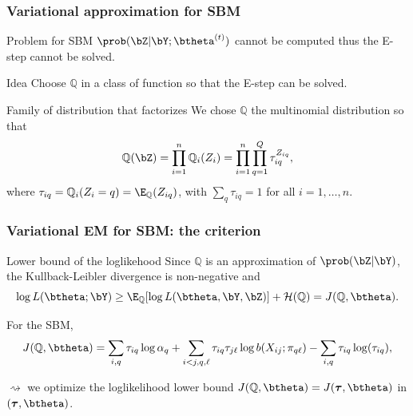 \documentclass{beamer}\usepackage[]{graphicx}\usepackage[]{color}
\begin{document}
\begin{frame}
  \frametitle{Variational approximation for SBM}

    \begin{block}{Problem for SBM}
      $\prob(\bZ|\bY;\btheta^{(t)})$ cannot be computed thus the E-step cannot be solved.
  \end{block}

  \begin{block}{Idea}
      Choose $\mathbb{Q}$ in a class of function so that the E-step can be solved.
  \end{block}

  \begin{block}{Family of distribution that factorizes}
      We chose $\mathbb{Q}$ the multinomial distribution so that
      \begin{equation*}
        \mathbb{Q}(\bZ) = \prod_{i=1}^n \mathbb{Q}_i(Z_i) = \prod_{i=1}^n\prod_{q=1}^Q \tau_{iq}^{Z_{iq}},
      \end{equation*}
      where $\tau_{iq} =\mathbb{Q}_i(Z_{i} = q) = \E_{\mathbb{Q}}(Z_{iq})$, with $\sum_{q} \tau_{iq} = 1$ for all $i=1,\dots,n$.
  \end{block}

\end{frame}

\begin{frame}
  \frametitle{Variational EM for SBM: the criterion}

  \begin{block}{Lower bound of the loglikehood}
  Since $\mathbb{Q}$ is an approximation of $\prob(\bZ|\bY)$, the Kullback-Leibler divergence is non-negative and
    \begin{equation*}
      \log L(\btheta; \bY) \geq \E_{\mathbb{Q}} [\log L(\btheta, \bY,\bZ)] + \mathcal{H}(\mathbb{Q}) = J(\mathbb{Q},\btheta).
    \end{equation*}
  \end{block}

  For the SBM,
  \begin{equation*}
  J(\mathbb{Q},\btheta) = \sum_{i,q} \tau_{iq} \log \alpha_q + \sum_{i<j,q,\ell}  \tau_{iq}  \tau_{j\ell} \log b(X_{ij} ; \pi_{q\ell}) - \sum_{i,q} \tau_{iq} \log(\tau_{iq}),
  \end{equation*}

  $\rightsquigarrow$ we optimize the loglikelihood lower bound $J(\mathbb{Q},\btheta) = J(\boldsymbol\tau,\btheta)$ in $(\boldsymbol\tau, \btheta)$.

\end{frame}
\end{document}
